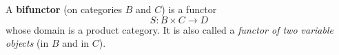 A \textbf{bifunctor} (on categories $B$ and $C$) is a functor
$$S: B \times C \to D$$
whose domain is a product category. It is also called a \textit{functor of two variable objects} (in $B$ and in $C$).
